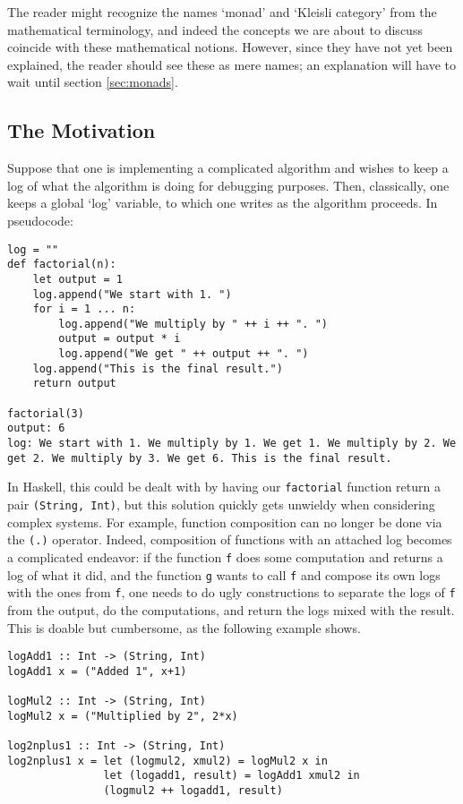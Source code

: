 \documentclass[11	pt]{article}
\theoremstyle{nonumberplain}
\newcommand*\lsin{\lstinline}
\begin{document}
The reader might recognize the names `monad' and `Kleisli category' from the mathematical terminology, and indeed the concepts we are about to discuss coincide with these mathematical notions. However, since they have not yet been explained, the reader should see these as mere names; an explanation will have to wait until section \ref{sec:monads}.

\subsection{The Motivation}

Suppose that one is implementing a complicated algorithm and wishes to keep a log of what the algorithm is doing for debugging purposes. Then, classically, one keeps a global `log' variable, to which one writes as the algorithm proceeds. In pseudocode:
\begin{lstlisting}
log = ""
def factorial(n):
	let output = 1
	log.append("We start with 1. ")
	for i = 1 ... n:
		log.append("We multiply by " ++ i ++ ". ")
		output = output * i
		log.append("We get " ++ output ++ ". ")
	log.append("This is the final result.")
	return output

factorial(3)
output: 6
log: We start with 1. We multiply by 1. We get 1. We multiply by 2. We get 2. We multiply by 3. We get 6. This is the final result.
\end{lstlisting}

In Haskell, this could be dealt with by having our \lsin|factorial| function return a pair \lsin|(String, Int)|, but this solution quickly gets unwieldy when considering complex systems. For example, function composition can no longer be done via the \lsin|(.)| operator. Indeed, composition of functions with an attached log becomes a complicated endeavor: if the function \lsin|f| does some computation and returns a log of what it did, and the function \lsin|g| wants to call \lsin|f| and compose its own logs with the ones from \lsin|f|, one needs to do ugly constructions to separate the logs of \lsin|f| from the output, do the computations, and return the logs mixed with the result. This is doable but cumbersome, as the following example shows.
\begin{lstlisting}
logAdd1 :: Int -> (String, Int)
logAdd1 x = ("Added 1", x+1)

logMul2 :: Int -> (String, Int)
logMul2 x = ("Multiplied by 2", 2*x)

log2nplus1 :: Int -> (String, Int)
log2nplus1 x = let (logmul2, xmul2) = logMul2 x in
               let (logadd1, result) = logAdd1 xmul2 in
               (logmul2 ++ logadd1, result)
\end{lstlisting}
\end{document}
